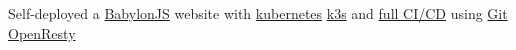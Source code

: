 {Self-deployed a \href{https://www.babylonjs.com/}{BabylonJS} website with \href{https://github.com/sachiniyer/cheap_portable_k3s\#applications}{kubernetes} \href{https://github.com/sachiniyer/cheap_portable_k3s/blob/main/README.pdf}{k3s} and \href{https://blog.sachiniyer.com/posts/post1/}{full CI/CD} using \href{https://github.com/kubernetes/git-sync}{Git OpenResty}}
